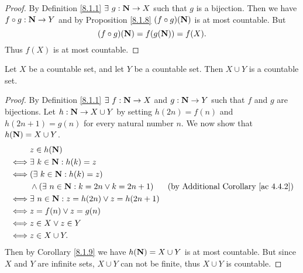 \begin{proof}
    By Definition \ref{8.1.1} \(\exists\ g : \mathbf{N} \to X\) such that \(g\) is a bijection.
    Then we have \(f \circ g : \mathbf{N} \to Y\) and by Proposition \ref{8.1.8} \((f \circ g)(\mathbf{N})\) is at most countable.
    But
    \[
        (f \circ g)(\mathbf{N}) = f(g(\mathbf{N})) = f(X).
    \]
    Thus \(f(X)\) is at most countable.
\end{proof}

\begin{proposition}\label{8.1.10}
    Let \(X\) be a countable set, and let \(Y\) be a countable set.
    Then \(X \cup Y\) is a countable set.
\end{proposition}

\begin{proof}
    By Definition \ref{8.1.1} \(\exists\ f : \mathbf{N} \to X\) and \(g : \mathbf{N} \to Y\) such that \(f\) and \(g\) are bijections.
    Let \(h : \mathbf{N} \to X \cup Y\) by setting \(h(2n) = f(n)\) and \(h(2n + 1) = g(n)\) for every natural number \(n\).
    We now show that \(h(\mathbf{N}) = X \cup Y\).
    \begin{align*}
             & z \in h(\mathbf{N})                                                                                          \\
        \iff & \exists\ k \in \mathbf{N} : h(k) = z                                                                         \\
        \iff & (\exists\ k \in \mathbf{N} : h(k) = z)                                                                       \\
             & \land (\exists\ n \in \mathbf{N} : k = 2n \lor k = 2n + 1) & \text{(by Additional Corollary \ref{ac 4.4.2})} \\
        \iff & \exists\ n \in \mathbf{N} : z = h(2n) \lor z = h(2n + 1)                                                     \\
        \iff & z = f(n) \lor z = g(n)                                                                               \\
        \iff & z \in X \lor z \in Y                                                                                 \\
        \iff & z \in X \cup Y.
    \end{align*}
    Then by Corollary \ref{8.1.9} we have \(h(\mathbf{N}) = X \cup Y\) is at most countable.
    But since \(X\) and \(Y\) are infinite sets, \(X \cup Y\) can not be finite, thus \(X \cup Y\) is countable.
\end{proof}

